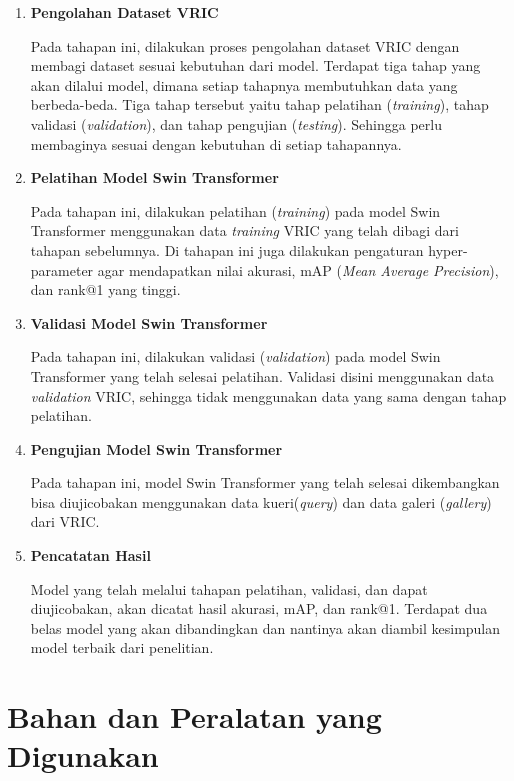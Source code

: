 \begin{enumerate}[nolistsep]

  \item \textbf{Pengolahan Dataset VRIC}
  
  Pada tahapan ini, dilakukan proses pengolahan dataset VRIC dengan 
  membagi dataset sesuai kebutuhan dari model. Terdapat tiga tahap yang akan 
  dilalui model, dimana setiap tahapnya membutuhkan data yang berbeda-beda. Tiga 
  tahap tersebut yaitu  tahap \linebreak pelatihan (\emph{training}), tahap validasi 
  (\emph{validation}), dan tahap pengujian (\emph{testing}). Sehingga perlu membaginya 
  sesuai dengan kebutuhan di setiap tahapannya.

  \item \textbf{Pelatihan Model Swin Transformer}
  
  Pada tahapan ini, dilakukan pelatihan (\emph{training}) pada model Swin Transformer 
  menggunakan data \emph{training} VRIC yang telah dibagi dari tahapan sebelumnya. 
  Di tahapan ini juga dilakukan pengaturan hyper-parameter agar mendapatkan nilai akurasi, 
  mAP (\emph{Mean Average Precision}), dan rank@1 yang tinggi.

  \item \textbf{Validasi Model Swin Transformer}
  
  Pada tahapan ini, dilakukan validasi (\emph{validation}) pada model Swin Transformer yang 
  telah selesai pelatihan. Validasi disini menggunakan data \emph{validation} VRIC, sehingga 
  tidak menggunakan data yang sama dengan tahap pelatihan.

  \item \textbf{Pengujian Model Swin Transformer}
  
  Pada tahapan ini, model Swin Transformer yang telah selesai dikembangkan bisa diujicobakan 
  menggunakan data kueri(\emph{query}) dan data galeri (\emph{gallery}) dari VRIC.

  \item \textbf{Pencatatan Hasil}
  
  Model yang telah melalui tahapan pelatihan, validasi, dan dapat diujicobakan, akan 
  dicatat hasil akurasi, mAP, dan rank@1. Terdapat dua belas model yang akan dibandingkan 
  dan nantinya akan diambil kesimpulan model terbaik dari penelitian.

\end{enumerate}

\section{Bahan dan Peralatan yang Digunakan}
\label{sec:bahandanperalatanyangdigunakan}

